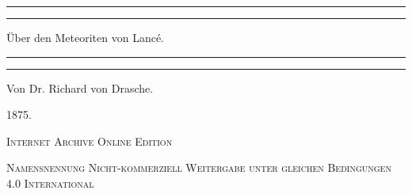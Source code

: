 \documentclass[a4paper, 11pt, oneside]{article}
\begin{document}
\swabfamily
\begin{titlepage} %
	\centering %

	
	\rule{\textwidth}{1.6pt}\vspace*{-\baselineskip}\vspace*{2pt} %
	\rule{\textwidth}{0.4pt} %
	
	\vspace{1.5\baselineskip} %
	
	{\Huge Über den Meteoriten von Lancé.}
	
	\vspace{1.5\baselineskip} %

	\rule{\textwidth}{0.4pt}\vspace*{-\baselineskip}\vspace{3.2pt} %
	\rule{\textwidth}{1.6pt} %
	
	\vspace{1\baselineskip} %
	
	
	{\large Von Dr. Richard von Drasche.} %
	
	\vspace*{1\baselineskip} %
	
    \vspace*{\fill}

	\vspace{1\baselineskip}

	{\small\scshape 1875.}
	
	\vspace{0.5\baselineskip} %

    \scshape Internet Archive Online Edition  %
	
	{\scshape\small Namensnennung Nicht-kommerziell Weitergabe unter gleichen Bedingungen 4.0 International} %
\end{titlepage}
\setlength{\parskip}{1mm plus1mm minus1mm}
\clearpage
\LARGE
\pagestyle{fancy}
\fancyhf{}
\cfoot{\swabfamily{\thepage}}
\end{document}

